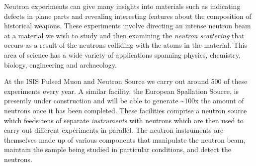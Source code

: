 Neutron experiments can give many insights into materials such as indicating defects in plane parts and revealing interesting features about the composition of historical weapons. These experiments involve directing an intense neutron beam at a material we wish to study and then examining the \textit{neutron scattering} that occurs as a result of the neutrons colliding with the atoms in the material. This area of science has a wide variety of applications spanning physics, chemistry, biology, engineering and archaeology.

At the ISIS Pulsed Muon and Neutron Source we carry out around 500 of these experiments every year. A similar facility, the European Spallation Source, is presently under construction and will be able to generate \textasciitilde 100x the amount of neutrons once it has been completed. These facilities comprise a neutron source which feeds tens of separate \textit{instruments} with neutrons which are then used to carry out different experiments in parallel. The neutron instruments are themselves made up of various components that manipulate the neutron beam, maintain the sample being studied in particular conditions, and detect the neutrons.
